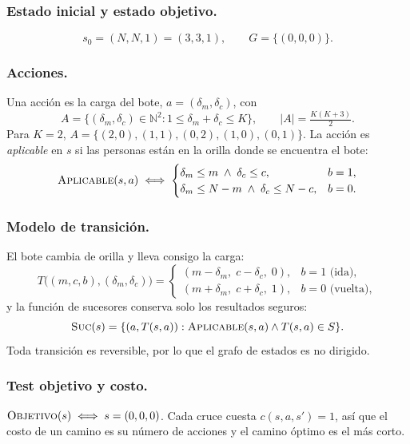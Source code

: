 \documentclass[runningheads]{llncs}
\begin{document}
\subsubsection{Estado inicial y estado objetivo.}
\begin{equation}
  s_0 = (N, N, 1) = (3,3,1), \qquad G = \{(0,0,0)\}.
\end{equation}

\subsubsection{Acciones.}
Una acción es la carga del bote, $a=(\delta_m, \delta_c)$, con
\begin{equation}
  A = \{(\delta_m,\delta_c)\in\mathbb{N}^2 : 1 \le \delta_m+\delta_c \le K\},
  \qquad |A| = \tfrac{K(K+3)}{2}.
\end{equation}
Para $K=2$, $A=\{(2,0),(1,1),(0,2),(1,0),(0,1)\}$. La acción es
\emph{aplicable} en $s$ si las personas están en la orilla donde se encuentra el bote:
\begin{equation}
  \textsc{Aplicable}(s,a) \iff
  \begin{cases}
    \delta_m \le m \;\land\; \delta_c \le c, & b = 1,\\
    \delta_m \le N-m \;\land\; \delta_c \le N-c, & b = 0.
  \end{cases}
\end{equation}

\subsubsection{Modelo de transición.}
El bote cambia de orilla y lleva consigo la carga:
\begin{equation}
  T\bigl((m,c,b),(\delta_m,\delta_c)\bigr) =
  \begin{cases}
    (m-\delta_m,\; c-\delta_c,\; 0), & b=1 \text{ (ida)},\\
    (m+\delta_m,\; c+\delta_c,\; 1), & b=0 \text{ (vuelta)},
  \end{cases}
\end{equation}
y la función de sucesores conserva solo los resultados seguros:
\begin{equation}
  \textsc{Suc}(s) = \{(a, T(s,a)) : \textsc{Aplicable}(s,a) \land T(s,a)\in S\}.
\end{equation}
Toda transición es reversible, por lo que el grafo de estados es no dirigido.

\subsubsection{Test objetivo y costo.}
$\textsc{Objetivo}(s) \iff s = (0,0,0)$. Cada cruce cuesta $c(s,a,s')=1$, así que
el costo de un camino es su número de acciones y el camino óptimo es el más corto.
\end{document}
